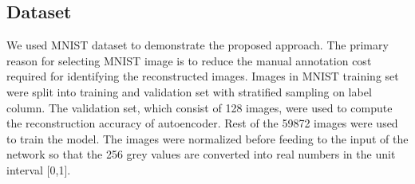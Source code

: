 \documentclass{uai2021} %
\begin{document}
\subsection{Dataset}
We used MNIST dataset\cite{mnist} to demonstrate the proposed approach.
The primary reason for selecting MNIST image is to reduce the manual annotation cost required for identifying the reconstructed images.
Images in MNIST training set were split into training and validation set with stratified sampling on label column.
The validation set, which consist of 128 images, were used to compute the reconstruction accuracy of autoencoder.
Rest of the 59872 images were used to train the model.
The images were normalized  before feeding to the input of the network so that the 256 grey values are converted into real numbers in the unit interval [0,1].
\end{document}
